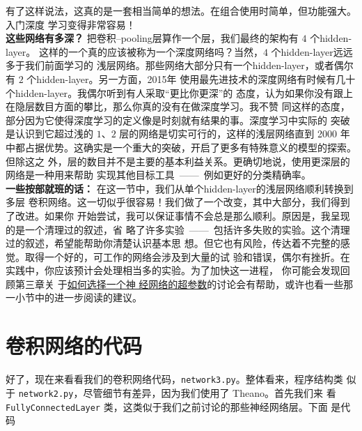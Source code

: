有了这样说法，这真的是一套相当简单的想法。在组合使用时简单，但功能强大。入门深度
学习变得非常容易！\\

\textbf{这些网络有多深？} 把卷积--\gls*{pooling}层算作一个层，我们最终的架构有 $4$ 个\gls*{hidden-layer}。
这样的一个真的应该被称为一个深度网络吗？当然，$4$ 个\gls*{hidden-layer}远远多于我们前面学习的
浅层网络。那些网络大部分只有一个\gls*{hidden-layer}，或者偶尔有 $2$ 个\gls*{hidden-layer}。另一方面，2015年
使用最先进技术的深度网络有时候有几十个\gls*{hidden-layer}。我偶尔听到有人采取“更比你更深”的
态度，认为如果你没有跟上在隐层数目方面的攀比，那么你真的没有在做深度学习。我不赞
同这样的态度，部分因为它使得深度学习的定义像是时刻就有结果的事。深度学习中实际的
突破是认识到它超过浅的 $1$、$2$ 层的网络是切实可行的，这样的浅层网络直到 2000 年
中都占据优势。这确实是一个重大的突破，开启了更多有特殊意义的模型的探索。但除这之
外，层的数目并不是主要的基本利益关系。更确切地说，使用更深层的网络是一种用来帮助
实现其他目标工具~——~例如更好的分类精确率。
\\

\textbf{一些按部就班的话：} 在这一节中，我们从单个\gls*{hidden-layer}的浅层网络顺利转换到多层
卷积网络。这一切似乎很容易！我们做了一个改变，其中大部分，我们得到了改进。如果你
开始尝试，我可以保证事情不会总是那么顺利。原因是，我呈现的是一个清理过的叙述，省
略了许多实验~——~包括许多失败的实验。这个清理过的叙述，希望能帮助你清楚认识基本思
想。但它也有风险，传达着不完整的感觉。取得一个好的，可工作的网络会涉及到大量的试
验和错误，偶尔有挫折。在实践中，你应该预计会处理相当多的实验。为了加快这一进程，
你可能会发现回顾第三章关
于\hyperref[sec:how_to_choose_a_neural_network's_hyper-parameters]{如何选择一个神
  经网络的超参数}的讨论会有帮助，或许也看一些那一小节中的进一步阅读的建议。

\section{卷积网络的代码}
\label{sec:the_code_for_our_convolutional_networks}

好了，现在来看看我们的卷积网络代码，\lstinline!network3.py!。整体看来，程序结构类
似于 \lstinline!network2.py!，尽管细节有差异，因为我们使用了 Theano。首先我们来
看 \lstinline!FullyConnectedLayer! 类，这类似于我们之前讨论的那些神经网络层。下面
是代码

